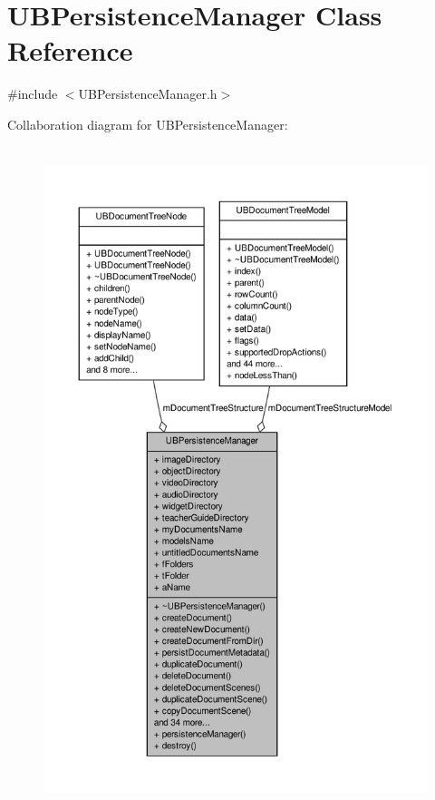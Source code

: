 \hypertarget{class_u_b_persistence_manager}{\section{U\-B\-Persistence\-Manager Class Reference}
\label{d0/dd5/class_u_b_persistence_manager}
}


{\ttfamily \#include $<$U\-B\-Persistence\-Manager.\-h$>$}



Collaboration diagram for U\-B\-Persistence\-Manager\-:
\nopagebreak
\begin{figure}[H]
\begin{center}
\leavevmode
\includegraphics[height=550pt]{d0/dae/class_u_b_persistence_manager__coll__graph}
\end{center}
\end{figure}
